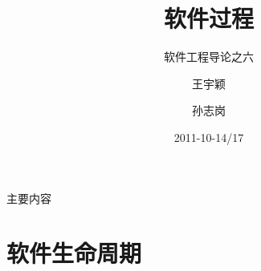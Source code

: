 
\graphicspath{{./software_process/}}

\title[Thinking in SE]
{软件过程}

\subtitle
{软件工程导论之六} %

\author[\url{http://sunner.cn}] %
{王宇颖 \and 孙志岗}


\date[Short Occasion] %
{2011-10-14/17}

\subject{Slides}










\begin{frame}
  \titlepage
\end{frame}

\begin{frame}{主要内容}
  \tableofcontents
\end{frame}

\section{软件生命周期}

